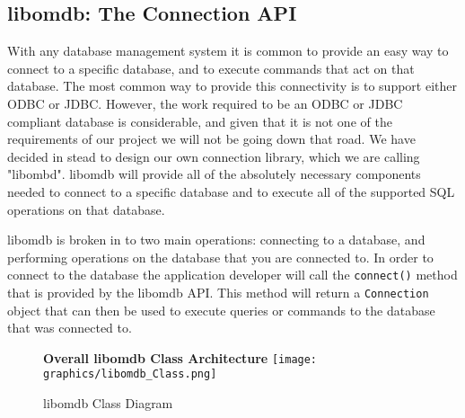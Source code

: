 \documentclass[letterpaper, 12pt]{article}
\begin{document}
  \subsection{libomdb: The Connection API}
  With any database management system it is common to provide an easy way to connect
  to a specific database, and to execute commands that act on that database. The most common
  way to provide this connectivity is to support either ODBC or JDBC. However, the work
  required to be an ODBC or JDBC compliant database is considerable, and given that it is
  not one of the requirements of our project we will not be going down that road. We have
  decided in stead to design our own connection library, which we are calling
  "libombd". libomdb will provide all of the absolutely necessary components needed to
  connect to a specific database and to execute all of the supported SQL operations on
  that database.
  \par\vspace{\baselineskip}
  libomdb is broken in to two main operations: connecting to a database, and performing
  operations on the database that you are connected to. In order to connect to the database
  the application developer will call the
  \lstinline[basicstyle=\ttfamily]|connect()| method that is provided by the libomdb API.
  This method will return a \lstinline[basicstyle=\ttfamily]|Connection| object that can
  then be used to execute queries or commands to the database that was connected to.
  \par\vspace{\baselineskip}

  \begin{figure}
    \centering
    \textbf{Overall libomdb Class Architecture}
    \texttt{[image: graphics/libomdb\_Class.png]}
    \caption{libomdb Class Diagram}
  \end{figure}
\end{document}
